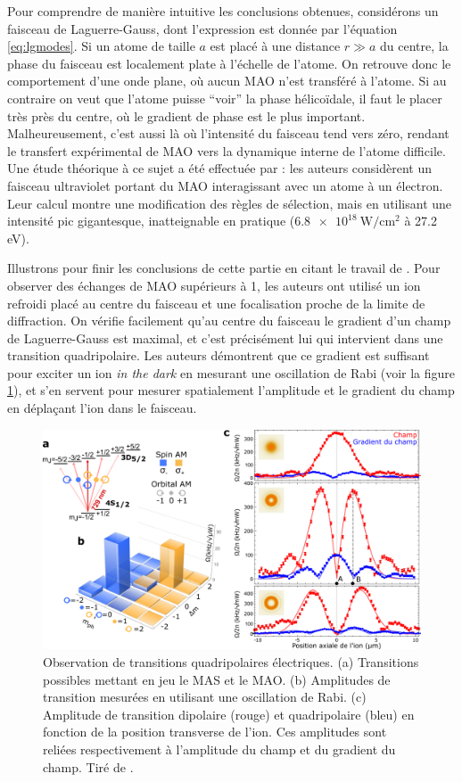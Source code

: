 Pour comprendre de manière intuitive les conclusions obtenues, considérons un faisceau de Laguerre-Gauss, dont l'expression est donnée par l'équation \ref{eq:lgmodes}. Si un atome de taille $a$ est placé à une distance $r\gg a$ du centre, la phase du faisceau est localement plate à l'échelle de l'atome. On retrouve donc le comportement d'une onde plane, où aucun MAO n'est transféré à l'atome. Si au contraire on veut que l'atome puisse ``voir'' la phase hélicoïdale, il faut le placer très près du centre, où le gradient de phase est le plus important. Malheureusement, c'est aussi là où l'intensité du faisceau tend vers zéro, rendant le transfert expérimental de MAO vers la dynamique interne de l'atome difficile. Une étude théorique à ce sujet a été effectuée par  : les auteurs considèrent un faisceau ultraviolet portant du MAO interagissant avec un atome à un électron. Leur calcul montre une modification des règles de sélection, mais en utilisant une intensité pic gigantesque, inatteignable en pratique ($\SI{6.8e18}{\W\per\centi\metre\squared}$ à 27.2 eV).

Illustrons pour finir les conclusions de cette partie en citant le travail de . Pour observer des échanges de MAO supérieurs à 1, les auteurs ont utilisé un ion refroidi placé au centre du faisceau et une focalisation proche de la limite de diffraction. On vérifie facilement qu'au centre du faisceau le gradient d'un champ de Laguerre-Gauss est maximal, et c'est précisément lui qui intervient dans une transition quadripolaire. Les auteurs démontrent que ce gradient est suffisant pour exciter un ion \textit{in the dark} en mesurant une oscillation de Rabi (voir la figure \ref{Fig:Schmiegelow}), et s'en servent pour mesurer spatialement l'amplitude et le gradient du champ en déplaçant l'ion dans le faisceau.

\begin{figure}[!ht]
\centering
\includegraphics[width=0.9\columnwidth]{Figures/schmiegelow.png}
\caption{Observation de transitions quadripolaires électriques. (a) Transitions possibles mettant en jeu le MAS et le MAO. (b) Amplitudes de transition mesurées en utilisant une oscillation de Rabi. (c) Amplitude de transition dipolaire (rouge) et quadripolaire (bleu) en fonction de la position transverse de l'ion. Ces amplitudes sont reliées respectivement à l'amplitude du champ et du gradient du champ. Tiré de .}
\label{Fig:Schmiegelow}
\end{figure}

